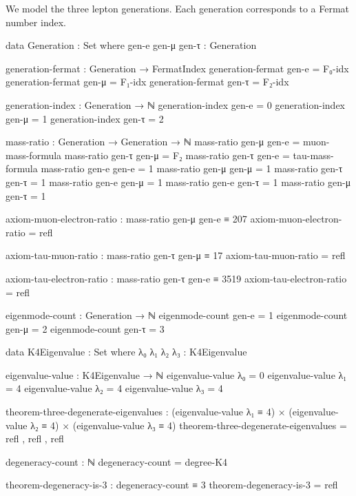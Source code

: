 \documentclass[11pt,a4paper]{book}
\begin{document}
We model the three lepton generations. Each generation corresponds to a Fermat number index.

\begin{code}
data Generation : Set where
  gen-e gen-μ gen-τ : Generation

generation-fermat : Generation → FermatIndex
generation-fermat gen-e = F₀-idx
generation-fermat gen-μ = F₁-idx
generation-fermat gen-τ = F₂-idx

generation-index : Generation → ℕ
generation-index gen-e = 0
generation-index gen-μ = 1
generation-index gen-τ = 2

mass-ratio : Generation → Generation → ℕ
mass-ratio gen-μ gen-e = muon-mass-formula
mass-ratio gen-τ gen-μ = F₂
mass-ratio gen-τ gen-e = tau-mass-formula
mass-ratio gen-e gen-e = 1
mass-ratio gen-μ gen-μ = 1
mass-ratio gen-τ gen-τ = 1
mass-ratio gen-e gen-μ = 1
mass-ratio gen-e gen-τ = 1
mass-ratio gen-μ gen-τ = 1

axiom-muon-electron-ratio : mass-ratio gen-μ gen-e ≡ 207
axiom-muon-electron-ratio = refl

axiom-tau-muon-ratio : mass-ratio gen-τ gen-μ ≡ 17
axiom-tau-muon-ratio = refl

axiom-tau-electron-ratio : mass-ratio gen-τ gen-e ≡ 3519
axiom-tau-electron-ratio = refl

eigenmode-count : Generation → ℕ
eigenmode-count gen-e = 1
eigenmode-count gen-μ = 2
eigenmode-count gen-τ = 3

data K4Eigenvalue : Set where
  λ₀ λ₁ λ₂ λ₃ : K4Eigenvalue

eigenvalue-value : K4Eigenvalue → ℕ
eigenvalue-value λ₀ = 0
eigenvalue-value λ₁ = 4
eigenvalue-value λ₂ = 4
eigenvalue-value λ₃ = 4

theorem-three-degenerate-eigenvalues :
  (eigenvalue-value λ₁ ≡ 4) ×
  (eigenvalue-value λ₂ ≡ 4) ×
  (eigenvalue-value λ₃ ≡ 4)
theorem-three-degenerate-eigenvalues = refl , refl , refl

degeneracy-count : ℕ
degeneracy-count = degree-K4

theorem-degeneracy-is-3 : degeneracy-count ≡ 3
theorem-degeneracy-is-3 = refl
\end{code}
\end{document}
